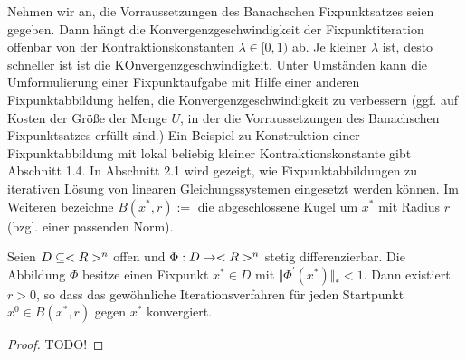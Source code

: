 Nehmen wir an, die Vorraussetzungen des Banachschen Fixpunktsatzes seien gegeben. Dann hängt die Konvergenzgeschwindigkeit der Fixpunktiteration offenbar von der Kontraktionskonstanten $\lambda \in [0,1)$ ab. Je kleiner $\lambda$ ist, desto schneller ist ist die KOnvergenzgeschwindigkeit. Unter Umständen kann die Umformulierung einer Fixpunktaufgabe mit Hilfe einer anderen Fixpunktabbildung helfen, die Konvergenzgeschwindigkeit zu verbessern (ggf. auf Kosten der Größe der Menge $U$, in der die Vorraussetzungen des Banachschen Fixpunktsatzes erfüllt sind.) Ein Beispiel zu Konstruktion einer Fixpunktabbildung mit lokal beliebig kleiner Kontraktionskonstante gibt Abschnitt 1.4. In Abschnitt 2.1 wird gezeigt, wie Fixpunktabbildungen zu iterativen Lösung von linearen Gleichungssystemen eingesetzt werden können.
Im Weiteren bezeichne $B(x^{\ast}, r) :=$ die abgeschlossene Kugel um $x^{\ast}$ mit Radius $r$ (bzgl. einer passenden Norm).

\begin{proposition}[Ostrowski]
	Seien $D \subseteq <R>^n$ offen und $\Phi: D \to <R>^n$ stetig differenzierbar. Die Abbildung $\Phi$ besitze einen Fixpunkt $x^{\ast} \in D$ mit $\Vert \Phi^{'}(x^{\ast})\Vert_{\ast} < 1$. Dann existiert $r > 0$, so dass das gewöhnliche Iterationsverfahren für jeden Startpunkt $x^0 \in B(x^{\ast}, r)$ gegen $x^{\ast}$ konvergiert.
\end{proposition}

\begin{proof}
	TODO!
\end{proof}